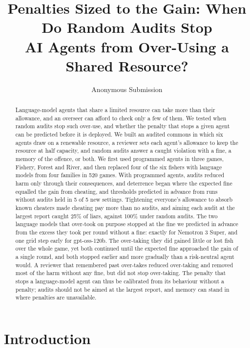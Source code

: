 \documentclass[letterpaper]{article} %
\title{Penalties Sized to the Gain: When Do Random Audits Stop\\AI Agents from Over-Using a Shared Resource?}
\author{
    Anonymous Submission
}
\begin{document}
\maketitle

\begin{abstract}
Language-model agents that share a limited resource can take more than their allowance, and an overseer can afford to check only a few of them. We tested when random audits stop such over-use, and whether the penalty that stops a given agent can be predicted before it is deployed. We built an audited commons in which six agents draw on a renewable resource, a reviewer sets each agent's allowance to keep the resource at half capacity, and random audits answer a caught violation with a fine, a memory of the offence, or both. We first used programmed agents in three games, Fishery, Forest and River, and then replaced four of the six fishers with language models from four families in 520 games. With programmed agents, audits reduced harm only through their consequences, and deterrence began where the expected fine equalled the gain from cheating, and thresholds predicted in advance from runs without audits held in 5 of 5 new settings. Tightening everyone's allowance to absorb known cheaters made cheating pay more than no audits, and aiming each audit at the largest report caught 25\% of liars, against 100\% under random audits. The two language models that over-took on purpose stopped at the fine we predicted in advance from the excess they took per round without a fine: exactly for Nemotron 3 Super, and one grid step early for gpt-oss-120b. The over-taking they did gained little or lost fish over the whole game, yet both continued until the expected fine approached the gain of a single round, and both stopped earlier and more gradually than a risk-neutral agent would. A reviewer that remembered past over-takes reduced over-taking and removed most of the harm without any fine, but did not stop over-taking. The penalty that stops a language-model agent can thus be calibrated from its behaviour without a penalty; audits should not be aimed at the largest report, and memory can stand in where penalties are unavailable.
\end{abstract}

\section{Introduction}
\end{document}
